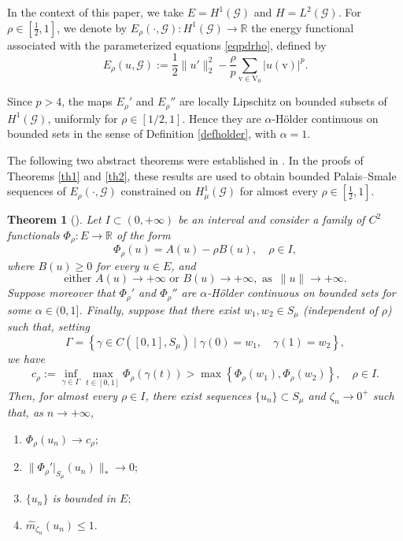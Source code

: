 \documentclass[11pt]{amsart}
\newtheorem{theorem}{Theorem}[section]
\newcommand{\abs}[1]{\lvert#1\rvert}
\newcommand{\norm}[1]{\lVert#1\rVert}
\newcommand{\G}{\mathcal{G}}
\newcommand{\V}{\mathrm{V}}
\newcommand{\R}{\mathbb{R}}
\newcommand{\vv}{\mathrm{v}}
\numberwithin{equation}{section}
\begin{document}
In the context of this paper, we take $E = H^1 (\G)$ and $H = L^2 (\G)$. For $\rho \in [\frac{1}{2},1]$, we denote by $E_\rho(\cdot,\G) : H^1(\G) \to \R$ the energy functional associated with the parameterized equations \eqref{eqpdrho}, defined by
\begin{equation}\label{funcrho}
E_\rho(u,\G) := \frac{1}{2}\norm{u'}^{2}_2-\frac{\rho}{p}\sum_{\vv \in \V_{0}}\abs{u(\vv)}^p.
\end{equation}

Since $p>4$, the maps $E_\rho'$ and $E_\rho''$ are locally Lipschitz on bounded subsets of $H^1(\G)$, uniformly for $\rho\in[1/2,1]$. Hence they are $\alpha$-H\"older continuous on bounded sets in the sense of Definition \ref{defholder}, with $\alpha=1$.

The following two abstract theorems were established in \cite{Bort0}. In the proofs of Theorems \ref{th1} and \ref{th2}, these results are used to obtain bounded Palais--Smale sequences of $E_\rho(\cdot,\G)$ constrained on $H_\mu^1(\G)$ for almost every $\rho \in [\frac{1}{2},1]$.
\begin{theorem}[{\cite[Theorem 1.10]{Bort0}}]\label{minimax0}
Let \( I \subset (0,+\infty) \) be an interval and consider a family of \( C^2 \) functionals \(\Phi_\rho : E \to \mathbb{R} \) of the form
\[
\Phi_\rho(u) = A(u) - \rho B(u), \quad \rho \in I,
\]
where \( B(u) \geq 0 \) for every \( u \in E \), and
\begin{equation}\label{asymptotic0}
    \text{either } A(u) \to +\infty \,\, \text{or } B(u) \to +\infty, \,\, \text{as } \,\|u\| \to +\infty.
\end{equation}
Suppose moreover that \(\Phi_\rho'\) and \(\Phi_\rho''\) are \(\alpha\)-H\"older continuous on bounded sets for some \(\alpha \in (0,1]\). Finally, suppose that there exist \( w_1, w_2 \in S_\mu \) (independent of \( \rho \)) such that, setting
\[
\Gamma = \left\{ \gamma \in C([0,1], S_\mu) \mid \gamma(0) = w_1, \quad \gamma(1) = w_2 \right\},
\]
we have
\begin{equation}\label{strit-ineq0}
    c_\rho := \inf_{\gamma \in \Gamma} \max_{t \in [0,1]} \Phi_\rho(\gamma(t)) > \max \left\{ \Phi_\rho(w_1), \Phi_\rho(w_2) \right\}, \quad \rho \in I.
\end{equation}
Then, for almost every \( \rho \in I \), there exist sequences \(\{u_n\} \subset S_\mu \) and \(\zeta_n \to 0^+\) such that, as \( n \to +\infty \),
\begin{enumerate}[label=\rm(\roman*)]
\item \(\Phi_\rho(u_n) \to c_\rho;\)
\item \(\|\Phi_\rho'|_{S_\mu}(u_n)\|_* \to 0;\)\label{minimax02}
\item \(\{u_n\}\) is bounded in \(E;\)
\item \(\hat{m}_{\zeta_n}(u_n) \leq 1.\)
\end{enumerate}
\end{theorem}
\end{document}
